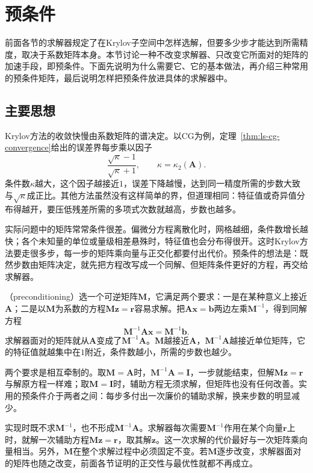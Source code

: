 \section{预条件}
\label{sec:ls-preconditioning}

前面各节的求解器规定了在Krylov子空间中怎样选解，但要多少步才能达到所需精度，取决于系数矩阵本身。本节讨论一种不改变求解器、只改变它所面对的矩阵的加速手段，即预条件。下面先说明为什么需要它、它的基本做法，再介绍三种常用的预条件矩阵，最后说明怎样把预条件放进具体的求解器中。

\subsection{主要思想}

Krylov方法的收敛快慢由系数矩阵的谱决定。以CG为例，定理~\ref{thm:ls-cg-convergence}给出的误差界每步乘以因子
\[
 \frac{\sqrt\kappa-1}{\sqrt\kappa+1},\qquad \kappa=\kappa_2(\bm A).
\]
条件数$\kappa$越大，这个因子越接近$1$，误差下降越慢，达到同一精度所需的步数大致与$\sqrt\kappa$成正比。其他方法虽然没有这样简单的界，但道理相同：特征值或奇异值分布得越开，要压低残差所需的多项式次数就越高，步数也越多。

实际问题中的矩阵常常条件很差。偏微分方程离散化时，网格越细，条件数增长越快；各个未知量的单位或量级相差悬殊时，特征值也会分布得很开。这时Krylov方法要走很多步，每一步的矩阵乘向量与正交化都要付出代价。预条件的想法是：既然步数由矩阵决定，就先把方程改写成一个同解、但矩阵条件更好的方程，再交给求解器。

（preconditioning）选一个可逆矩阵$\bm M$，它满足两个要求：一是在某种意义上接近$\bm A$；二是以$\bm M$为系数的方程$\bm M\bm z=\bm r$容易求解。把$\bm A\bm x=\bm b$两边左乘$\bm M^{-1}$，得到同解方程
\[
 \bm M^{-1}\bm A\bm x=\bm M^{-1}\bm b .
\]
求解器面对的矩阵就从$\bm A$变成了$\bm M^{-1}\bm A$。$\bm M$越接近$\bm A$，$\bm M^{-1}\bm A$越接近单位矩阵，它的特征值就越集中在$1$附近，条件数越小，所需的步数也越少。

两个要求是相互牵制的。取$\bm M=\bm A$时，$\bm M^{-1}\bm A=\bm I$，一步就能结束，但解$\bm M\bm z=\bm r$与解原方程一样难；取$\bm M=\bm I$时，辅助方程无须求解，但矩阵也没有任何改善。实用的预条件介于两者之间：每步多付出一次廉价的辅助求解，换来步数的明显减少。

实现时既不求$\bm M^{-1}$，也不形成$\bm M^{-1}\bm A$。求解器每次需要$\bm M^{-1}$作用在某个向量$\bm r$上时，就解一次辅助方程$\bm M\bm z=\bm r$，取其解$\bm z$。这一次求解的代价最好与一次矩阵乘向量相当。另外，$\bm M$在整个求解过程中必须固定不变。若$\bm M$逐步改变，求解器面对的矩阵也随之改变，前面各节证明的正交性与最优性就都不再成立。

